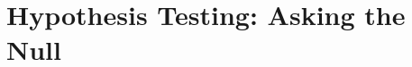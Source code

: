 \chapter{Hypothesis Testing: Asking the Null}\label{ch:04}

\providecommand{\FourABumpBtot}{}\renewcommand{\FourABumpBtot}{60}
\providecommand{\FourABumpStot}{}\renewcommand{\FourABumpStot}{9}
\providecommand{\FourABumpB}{}\renewcommand{\FourABumpB}{3.74}
\providecommand{\FourABumpN}{}\renewcommand{\FourABumpN}{10}
\providecommand{\FourABumpP}{}\renewcommand{\FourABumpP}{0.005172}
\providecommand{\FourABumpPmc}{}\renewcommand{\FourABumpPmc}{0.005133}
\providecommand{\FourABumpPmcErr}{}\renewcommand{\FourABumpPmcErr}{7.146\times10^{-5}}
\providecommand{\FourABumpZ}{}\renewcommand{\FourABumpZ}{2.56}
\providecommand{\FourABumpZnaive}{}\renewcommand{\FourABumpZnaive}{3.24}
\providecommand{\FourABumpZwrong}{}\renewcommand{\FourABumpZwrong}{1.98}
\providecommand{\FourACowanPone}{}\renewcommand{\FourACowanPone}{4.972\times10^{-4}}
\providecommand{\FourACowanPtwo}{}\renewcommand{\FourACowanPtwo}{1.721\times10^{-4}}
\providecommand{\FourACowanPthree}{}\renewcommand{\FourACowanPthree}{0.001411}
\providecommand{\FourACowanZone}{}\renewcommand{\FourACowanZone}{3.29}
\providecommand{\FourACowanZnaive}{}\renewcommand{\FourACowanZnaive}{4.36}
\providecommand{\FourACoinPone}{}\renewcommand{\FourACoinPone}{0.00129}
\providecommand{\FourACoinPtwo}{}\renewcommand{\FourACoinPtwo}{0.0026}
\providecommand{\FourACoinPtwoMC}{}\renewcommand{\FourACoinPtwoMC}{0.0028}
\providecommand{\FourAKrFixN}{}\renewcommand{\FourAKrFixN}{0.0320}
\providecommand{\FourAKrFixNMC}{}\renewcommand{\FourAKrFixNMC}{0.0325}
\providecommand{\FourAKrFixZ}{}\renewcommand{\FourAKrFixZ}{0.0173}
\providecommand{\FourAKrFixZMC}{}\renewcommand{\FourAKrFixZMC}{0.0173}
\providecommand{\FourACowStop}{}\renewcommand{\FourACowStop}{7.286\times10^{-4}}
\providecommand{\FourACowStopMC}{}\renewcommand{\FourACowStopMC}{7.500\times10^{-4}}
\providecommand{\FourAPowSizeFour}{}\renewcommand{\FourAPowSizeFour}{0.0508}
\providecommand{\FourAPowSizeSixtyfour}{}\renewcommand{\FourAPowSizeSixtyfour}{0.0518}
\providecommand{\FourAPowNreq}{}\renewcommand{\FourAPowNreq}{24.7}
\providecommand{\FourAPowNreqInt}{}\renewcommand{\FourAPowNreqInt}{25}
\providecommand{\FourAPowReqMC}{}\renewcommand{\FourAPowReqMC}{0.801}
\providecommand{\FourAPowWaldSize}{}\renewcommand{\FourAPowWaldSize}{0.0643}
\providecommand{\FourAPowNthree}{}\renewcommand{\FourAPowNthree}{11}
\providecommand{\FourAPowNfive}{}\renewcommand{\FourAPowNfive}{17}
\providecommand{\FourAPowSfiftyThree}{}\renewcommand{\FourAPowSfiftyThree}{7.6}
